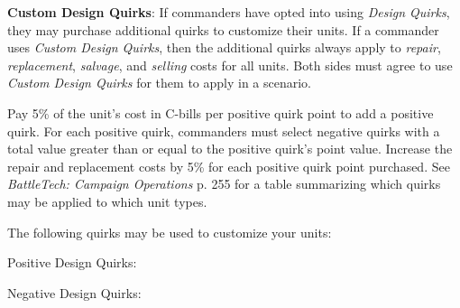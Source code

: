 \item {\bfseries Custom Design Quirks}: If commanders have opted into using \emph{Design Quirks}, they may purchase additional quirks to customize their units.
If a commander uses \emph{Custom Design Quirks}, then the additional quirks always apply to \emph{repair}, \emph{replacement}, \emph{salvage}, and \emph{selling} costs for all units.
Both sides must agree to use \emph{Custom Design Quirks} for them to apply in a scenario.

Pay 5\% of the unit's cost in C-bills per positive quirk point to add a positive quirk.
For each positive quirk, commanders must select negative quirks with a total value greater than or equal to the positive quirk's point value.
Increase the repair and replacement costs by 5\% for each positive quirk point purchased.
See \emph{BattleTech: Campaign Operations} p. 255 for a table summarizing which quirks may be applied to which unit types.

The following quirks may be used to customize your units:

Positive Design Quirks:



Negative Design Quirks:


